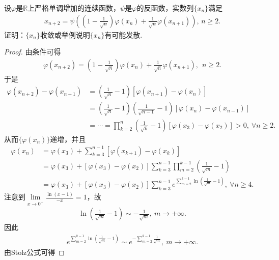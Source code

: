 \documentclass[../../main.tex]{subfiles}%
\begin{document}
\begin{example}
设$\varphi$是$\mathbb{R}$上严格单调增加的连续函数，$\psi$是$\varphi$的反函数，实数列$\{x_n\}$满足
\begin{align*}
x_{n+2} = \psi\left( \left(1 - \frac{1}{\sqrt{n}}\right)\varphi(x_n) + \frac{1}{\sqrt{n}}\varphi(x_{n+1}) \right), \, n \geqslant 2.
\end{align*}
证明：$\{x_n\}$收敛或举例说明$\{x_n\}$有可能发散.
\end{example}
\begin{proof}
由条件可得
\begin{align*}
\varphi(x_{n+2}) = \left(1 - \frac{1}{\sqrt{n}}\right)\varphi(x_n) + \frac{1}{\sqrt{n}}\varphi(x_{n+1}),\ \ n \geqslant 2.
\end{align*}
于是
\begin{align*}
\varphi(x_{n+2}) - \varphi(x_{n+1}) &= \left( \frac{1}{\sqrt{n}} - 1 \right)\left[ \varphi(x_{n+1}) - \varphi(x_n) \right] \\
&= \left( \frac{1}{\sqrt{n}} - 1 \right)\left( \frac{1}{\sqrt{n-1}} - 1 \right)\left[ \varphi(x_n) - \varphi(x_{n-1}) \right] \\
&= \cdots = \prod_{k=2}^n \left( \frac{1}{\sqrt{k}} - 1 \right)\left[ \varphi(x_3) - \varphi(x_2) \right] > 0,\ \forall n \geqslant 2.
\end{align*}
从而$\{\varphi(x_n)\}$递增，并且
\begin{align}
\varphi(x_n) &= \varphi(x_3) + \sum\limits_{k=3}^{n-1} \left[ \varphi(x_{k+1}) - \varphi(x_k) \right]\nonumber \\
&= \varphi(x_3) + \left[ \varphi(x_3) - \varphi(x_2) \right] \sum\limits_{k=3}^{n-1} \prod_{m=2}^{k-1} \left( \frac{1}{\sqrt{m}} - 1 \right) \nonumber \\
&= \varphi(x_3) + \left[ \varphi(x_3) - \varphi(x_2) \right] \sum\limits_{k=3}^{n-1} e^{\sum\limits_{m=2}^{k-1} \ln\left( \frac{1}{\sqrt{m}} - 1 \right)},\ \forall n \geqslant 4. \label{eq::382wer346456yt34t3y4g44j76k67opp}
\end{align}
注意到$\lim\limits_{x \to 0^+} \frac{\ln(x - 1)}{-x} = 1$，故
\begin{align*}
\ln\left( \frac{1}{\sqrt{m}} - 1 \right) \sim -\frac{1}{\sqrt{m}},\ m \to +\infty.
\end{align*}
因此
\begin{align*}
e^{\sum\limits_{m=2}^{k-1} \ln\left( \frac{1}{\sqrt{m}} - 1 \right)} \sim e^{-\sum\limits_{m=2}^{k-1} \frac{1}{\sqrt{m}}},\ m \to +\infty.
\end{align*}
由Stolz公式可得

\end{proof}
\end{document}
